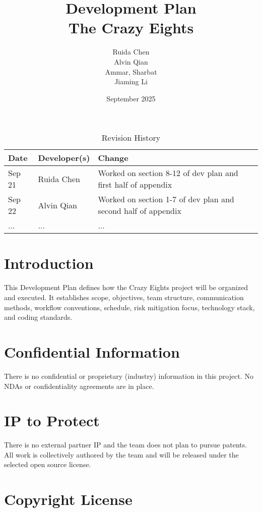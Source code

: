 \documentclass{article}
\title{Development Plan\\The Crazy Eights}
\author{Ruida Chen \\ Alvin Qian \\ Ammar, Sharbat \\ Jiaming Li}
\date{September 2025}
\begin{document}
\maketitle

\begin{table}[hp]
\caption{Revision History} \label{TblRevisionHistory}
\begin{tabularx}{\textwidth}{llX}
\toprule
\textbf{Date} & \textbf{Developer(s)} & \textbf{Change}\\
\midrule
Sep 21 & Ruida Chen & Worked on section 8-12 of dev plan and first half of appendix\\
Sep 22 & Alvin Qian & Worked on section 1-7 of dev plan and second half of appendix\\
... & ... & ...\\
\bottomrule
\end{tabularx}
\end{table}

\newpage{}

\section{Introduction}

This Development Plan defines how the Crazy Eights project will be organized and executed. It establishes scope, objectives, team structure, communication methods, workflow conventions, schedule, risk mitigation focus, technology stack, and coding standards.

\section{Confidential Information}

There is no confidential or proprietary (industry) information in this project. No NDAs or confidentiality agreements are in place.

\section{IP to Protect}

There is no external partner IP and the team does not plan to pursue patents. All work is collectively authored by the team and will be released under the selected open source license.

\section{Copyright License}
\end{document}
